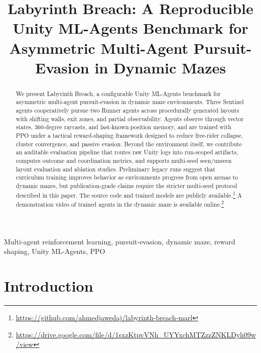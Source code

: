 \documentclass[conference]{IEEEtran}
\title{Labyrinth Breach: A Reproducible Unity ML-Agents Benchmark for Asymmetric Multi-Agent Pursuit-Evasion in Dynamic Mazes}
\author{
\IEEEauthorblockN{
Ahmed Jawed,
Muhammad Sikander Raheem,
Usman Irshad Bhatti
}
\IEEEauthorblockA{
25280017 \quad 25280099 \quad 25280040\\
MS AI, LUMS\\
AI641 -- AI for Robotics
}
}
\begin{document}
\maketitle

\begin{center}
\end{center}

\begin{abstract}
We present Labyrinth Breach, a configurable Unity ML-Agents benchmark for asymmetric multi-agent pursuit-evasion in dynamic maze environments. Three Sentinel agents cooperatively pursue two Runner agents across procedurally generated layouts with shifting walls, exit zones, and partial observability. Agents observe through vector states, 360-degree raycasts, and last-known-position memory, and are trained with PPO under a tactical reward-shaping framework designed to reduce free-rider collapse, cluster convergence, and passive evasion. Beyond the environment itself, we contribute an auditable evaluation pipeline that routes raw Unity logs into run-scoped artifacts, computes outcome and coordination metrics, and supports multi-seed seen/unseen layout evaluation and ablation studies. Preliminary legacy runs suggest that curriculum training improves behavior as environments progress from open arenas to dynamic mazes, but publication-grade claims require the stricter multi-seed protocol described in this paper. The source code and trained models are publicly available.\footnote{\url{https://github.com/ahmedjawedaj/labyrinth-breach-marl}} A demonstration video of trained agents in the dynamic maze is available online.\footnote{\url{https://drive.google.com/file/d/1sxzKtpvVNh_UYYxchMTZzzZNKLDyh09w/view}}
\end{abstract}

\begin{IEEEkeywords}
Multi-agent reinforcement learning, pursuit-evasion, dynamic maze, reward shaping, Unity ML-Agents, PPO
\end{IEEEkeywords}

\section{Introduction}
\end{document}
